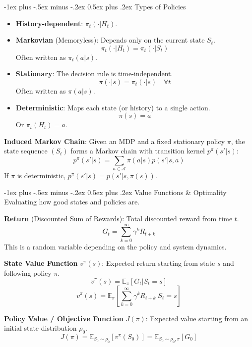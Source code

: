 \documentclass[10pt,landscape]{article}
\makeatletter
\renewcommand{\section}{\@startsection{section}{1}{0mm}%
                                {-1ex plus -.5ex minus -.2ex}%
                                {0.5ex plus .2ex}%
                                {\normalfont\large\bfseries}}
\renewcommand{\subsection}{\@startsection{subsection}{2}{0mm}%
                                {-1ex plus -.5ex minus -.2ex}%
                                {0.5ex plus .2ex}%
                                {\normalfont\normalsize\bfseries}}
\makeatother
\begin{document}
\begin{multicols}{3}
    \subsection{Types of Policies}
    \begin{itemize}[label={--},leftmargin=4mm, itemsep=-.4mm]
        \item \textbf{History-dependent}: $\pi_t(\cdot | H_t)$.
        \item \textbf{Markovian} (Memoryless): Depends only on the current state $S_t$.
              $$ \pi_t(\cdot | H_t) = \pi_t(\cdot | S_t) $$
              Often written as $\pi_t(a|s)$.
        \item \textbf{Stationary}: The decision rule is time-independent.
              $$ \pi(\cdot | s) = \pi_t(\cdot | s) \quad \forall t $$
              Often written as $\pi(a|s)$.
        \item \textbf{Deterministic}: Maps each state (or history) to a single action.
              $$ \pi(s) = a $$
              Or $\pi_t(H_t) = a$.
    \end{itemize}

    \textbf{Induced Markov Chain}: Given an MDP and a fixed stationary policy $\pi$, the state sequence $(S_t)$ forms a Markov chain with transition kernel $p^\pi(s'|s)$:
    $$ p^\pi(s'|s) = \sum_{a \in \mathcal{A}} \pi(a|s) p(s'|s,a) $$
    If $\pi$ is deterministic, $p^\pi(s'|s) = p(s'|s,\pi(s))$.

    \section{Value Functions \& Optimality}
    Evaluating how good states and policies are.

    \textbf{Return} (Discounted Sum of Rewards): Total discounted reward from time $t$.
    $$ G_t = \sum_{k=0}^\infty \gamma^k R_{t+k} $$
    This is a random variable depending on the policy and system dynamics.

    \textbf{State Value Function} $v^\pi(s)$: Expected return starting from state $s$ and following policy $\pi$.
    $$ v^\pi(s) = \mathbb{E}_\pi [ G_t | S_t = s ] $$
    $$ v^\pi(s) = \mathbb{E}_\pi \left[ \sum_{k=0}^\infty \gamma^k R_{t+k} \bigg| S_t = s \right] $$

    \textbf{Policy Value / Objective Function} $J(\pi)$: Expected value starting from an initial state distribution $\rho_0$.
    $$ J(\pi) = \mathbb{E}_{S_0 \sim \rho_0} [ v^\pi(S_0) ] = \mathbb{E}_{S_0 \sim \rho_0, \pi} [ G_0 ] $$


\end{multicols}
\end{document}
